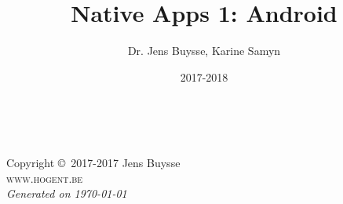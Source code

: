 \documentclass[11pt,fleqn,a4paper]{book}
\author{Dr. Jens Buysse, Karine Samyn}
\title{Native Apps 1: Android}
\date{2017-2018}
\begin{document}
\thetitlepage


\newpage
~\vfill
\thispagestyle{empty}

\noindent Copyright \copyright\ 2017-2017 Jens Buysse\\ %

\noindent \textsc{www.hogent.be}\\ %

\noindent \textit{Generated on \today} %



\tableofcontents %

\cleardoublepage %

\setlength{\parindent}{0pt}
















\printbibliography

\printindex
\end{document}
